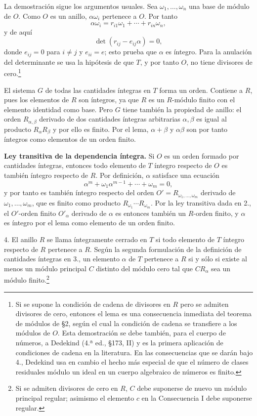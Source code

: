 \documentclass[11pt]{article}
\begin{document}
La demostración sigue los argumentos usuales. Sea $\omega_1,\ldots,\omega_n$ una base de módulo de $O$. Como $O$ es un anillo, $\alpha\omega_i$ pertenece a $O$. Por tanto
\[
        \alpha\omega_i=r_{i1}\omega_1+\cdots+r_{in}\omega_n,
\]
y de aquí
\[
        \det(r_{ij}-e_{ij}\alpha)=0,
\]
donde $e_{ij}=0$ para $i\ne j$ y $e_{ii}=e$; esto prueba que $\alpha$ es íntegro. Para la anulación del determinante se usa la hipótesis de que $T$, y por tanto $O$, no tiene divisores de cero.\footnote{Si se supone la condición de cadena de divisores en $R$ pero se admiten divisores de cero, entonces el lema es una consecuencia inmediata del teorema de módulos de §2, según el cual la condición de cadena se transfiere a los módulos de $O$. Esta demostración se debe también, para el cuerpo de números, a Dedekind (4.ª ed., §173, II) y es la primera aplicación de condiciones de cadena en la literatura. En las consecuencias que se darán bajo 4., Dedekind usa en cambio el hecho más especial de que el número de clases residuales módulo un ideal en un cuerpo algebraico de números es finito.}

El sistema $G$ de todas las cantidades íntegras en $T$ forma un orden. Contiene a $R$, pues los elementos de $R$ son íntegros, ya que $R$ es un $R$-módulo finito con el elemento identidad como base. Pero $G$ tiene también la propiedad de anillo: el orden $R_{\alpha,\beta}$ derivado de dos cantidades íntegras arbitrarias $\alpha,\beta$ es igual al producto $R_\alpha R_\beta$ y por ello es finito. Por el lema, $\alpha+\beta$ y $\alpha\beta$ son por tanto íntegros como elementos de un orden finito.

\medskip
\noindent\textbf{Ley transitiva de la dependencia íntegra.} Si $O$ es un orden formado por cantidades íntegras, entonces todo elemento de $T$ íntegro respecto de $O$ es también íntegro respecto de $R$. Por definición, $\alpha$ satisface una ecuación
\[
        \alpha^m+\omega_1\alpha^{m-1}+\cdots+\omega_m=0,
\]
y por tanto es también íntegro respecto del orden $O'=R_{\omega_1,\ldots,\omega_m}$ derivado de $\omega_1,\ldots,\omega_m$, que es finito como producto $R_{\omega_1}\cdots R_{\omega_m}$. Por la ley transitiva dada en 2., el $O'$-orden finito $O'_\alpha$ derivado de $\alpha$ es entonces también un $R$-orden finito, y $\alpha$ es íntegro por el lema como elemento de un orden finito.

4. El anillo $R$ se llama íntegramente cerrado en $T$ si todo elemento de $T$ íntegro respecto de $R$ pertenece a $R$. Según la segunda formulación de la definición de cantidades íntegras en 3., un elemento $\alpha$ de $T$ pertenece a $R$ si y sólo si existe al menos un módulo principal $C$ distinto del módulo cero tal que $CR_\alpha$ sea un módulo finito.\footnote{Si se admiten divisores de cero en $R$, $C$ debe suponerse de nuevo un módulo principal regular; asimismo el elemento $c$ en la Consecuencia I debe suponerse regular.}
\end{document}
